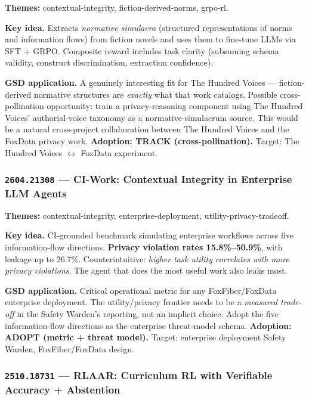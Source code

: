 \documentclass[11pt,letterpaper]{article}
\newcommand{\arxivid}[1]{\texttt{\textcolor{accent}{#1}}}
\newcommand{\paperhead}[2]{\noindent\textbf{\sffamily\textcolor{secondary}{#1}} \textemdash{} #2}
\begin{document}
\paperhead{Themes:}{contextual-integrity, fiction-derived-norms, grpo-rl.}

\textbf{Key idea.} Extracts \textit{normative simulacra} (structured representations of norms and information flows) from fiction novels and uses them to fine-tune LLMs via SFT + GRPO. Composite reward includes task clarity (subsuming schema validity, construct discrimination, extraction confidence).

\textbf{GSD application.} A genuinely interesting fit for The Hundred Voices --- fiction-derived normative structures are \textit{exactly} what that work catalogs. Possible cross-pollination opportunity: train a privacy-reasoning component using The Hundred Voices' authorial-voice taxonomy as a normative-simulacrum source. This would be a natural cross-project collaboration between The Hundred Voices and the FoxData privacy work. \textbf{Adoption: TRACK (cross-pollination).} Target: The Hundred Voices $\leftrightarrow$ FoxData experiment.

\subsubsection{\arxivid{2604.21308} --- CI-Work: Contextual Integrity in Enterprise LLM Agents}

\paperhead{Themes:}{contextual-integrity, enterprise-deployment, utility-privacy-tradeoff.}

\textbf{Key idea.} CI-grounded benchmark simulating enterprise workflows across five information-flow directions. \textbf{Privacy violation rates 15.8\%--50.9\%}, with leakage up to 26.7\%. Counterintuitive: \textit{higher task utility correlates with more privacy violations}. The agent that does the most useful work also leaks most.

\textbf{GSD application.} Critical operational metric for any FoxFiber/FoxData enterprise deployment. The utility/privacy frontier needs to be a \textit{measured trade-off} in the Safety Warden's reporting, not an implicit choice. Adopt the five information-flow directions as the enterprise threat-model schema. \textbf{Adoption: ADOPT (metric + threat model).} Target: enterprise deployment Safety Warden, FoxFiber/FoxData design.

\subsubsection{\arxivid{2510.18731} --- RLAAR: Curriculum RL with Verifiable Accuracy + Abstention}
\end{document}
